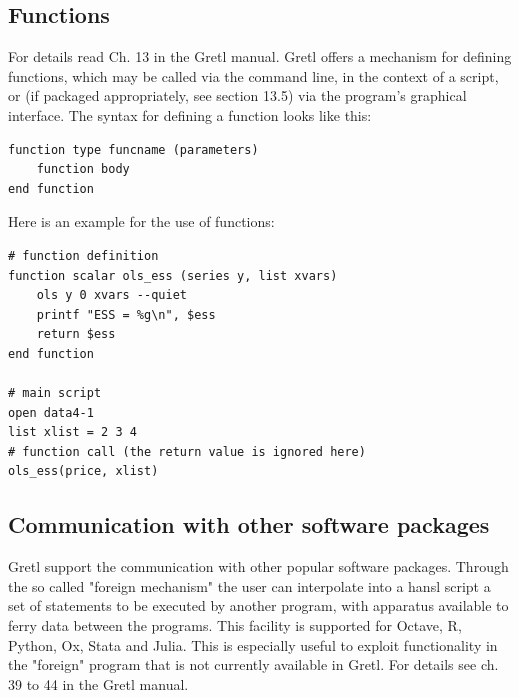 \documentclass[11pt]{article}
\begin{document}
\subsection{Functions}
For details read Ch. 13 in the Gretl manual. Gretl offers a mechanism for defining functions, which may be called via the command line, in the context of a script, or (if packaged appropriately, see section 13.5) via the program’s graphical interface. The syntax for defining a function looks like this:
\begin{Verbatim}[baselinestretch=0.75, fontsize=\small, frame=single]
function type funcname (parameters)
	function body
end function
\end{Verbatim}

Here is an example for the use of functions:
\begin{Verbatim}[baselinestretch=0.75, fontsize=\small, frame=single]
# function definition
function scalar ols_ess (series y, list xvars)
	ols y 0 xvars --quiet
	printf "ESS = %g\n", $ess
	return $ess
end function

# main script
open data4-1
list xlist = 2 3 4
# function call (the return value is ignored here)
ols_ess(price, xlist)
\end{Verbatim}


\subsection{Communication with other software packages}
\label{sec:foreign}
Gretl support the communication with other popular software packages. Through the so called "foreign mechanism" the user can interpolate into a hansl script a set of statements to be executed by another program, with apparatus available to ferry data between the programs. This facility is supported for Octave, R, Python, Ox, Stata and Julia. This is especially useful to exploit functionality in the "foreign" program that is not currently available in Gretl. For details see ch. 39 to 44 in the Gretl manual.
\end{document}
